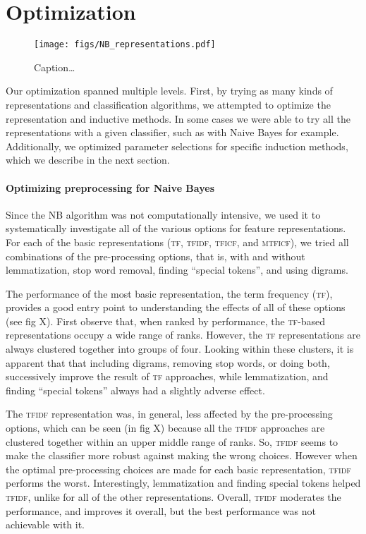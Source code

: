 \documentclass[conference,letterpaper]{IEEEtran}
\begin{document}
\section{Optimization}
\begin{figure*}
	\centering
	\texttt{[image: figs/NB\_representations.pdf]}
	\caption{Caption\dots}
	\label{fig:NB_representations}
\end{figure*}
Our optimization spanned multiple levels.  First, by trying as many kinds
of representations and classification algorithms, we attempted to optimize 
the representation and inductive methods.  In some cases we were able to try
all the representations with a given classifier, such as with Naive Bayes for 
example.  Additionally, we optimized parameter selections for specific
induction methods, which we describe in the next section.

\paragraph*{Optimizing preprocessing for Naive Bayes}
Since the \textsc{NB} algorithm was not 
computationally intensive, we used it to systematically investigate all of the
various options for feature representations.  For each of the basic 
representations (\textsc{tf}, \textsc{tfidf}, \textsc{tficf}, and 
\textsc{mtficf}), we tried all combinations of the pre-processing options, 
that is, with and without lemmatization, stop word removal, finding ``special 
tokens'', and using digrams.

The performance of the most basic representation, the term frequency 
(\textsc{tf}), provides a good entry point to understanding the effects
of all of these options (see fig X).  First observe that, when ranked by 
performance, the \textsc{tf}-based representations occupy a wide range of 
ranks.  However, the \textsc{tf} representations are always clustered together
into groups of four.  Looking within these clusters, it is apparent that
that including digrams, removing stop words,
or doing both, successively improve the result of \textsc{tf} approaches,
while lemmatization, and finding ``special tokens'' always had a slightly
adverse effect.

The \textsc{tfidf} representation was, in general, less affected by the
pre-processing options, which can be seen (in fig X) because all the
\textsc{tfidf} approaches are clustered together within an upper middle 
range of ranks.  So, \textsc{tfidf} seems to make the classifier more robust
against making the wrong choices.  However when the optimal pre-processing 
choices are made for each basic representation, \textsc{tfidf} performs
the worst.  Interestingly, lemmatization and finding special tokens helped
\textsc{tfidf}, unlike for all of the other representations.  
Overall, \textsc{tfidf} moderates the performance, and improves it
overall, but the best performance was not achievable with it.
\end{document}
